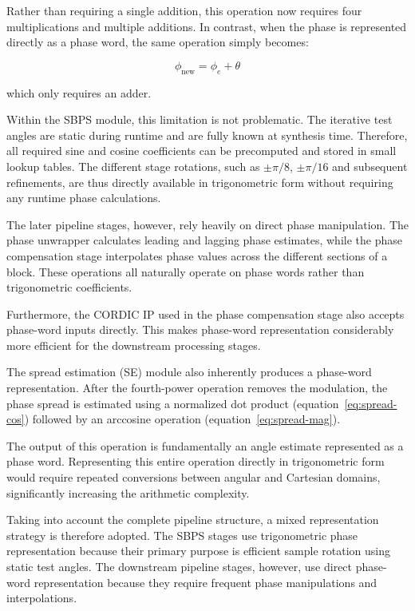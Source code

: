 Rather than requiring a single addition, this operation now requires four multiplications and multiple additions. 
In contrast, when the phase is represented directly as a phase word, the same operation simply becomes:

\begin{equation}
    \phi_{\text{new}} = \phi_e + \theta
\end{equation}

which only requires an adder.

Within the \ac{SBPS} module, this limitation is not problematic. The iterative test angles are static during runtime and are fully 
known at synthesis time. Therefore, all required sine and cosine coefficients can be precomputed and stored in small lookup tables. 
The different stage rotations, such as $\pm \pi/8$, $\pm \pi/16$ and subsequent refinements, are thus directly available in 
trigonometric form without requiring any runtime phase calculations.

The later pipeline stages, however, rely heavily on direct phase manipulation. The phase unwrapper calculates leading and lagging 
phase estimates, while the phase compensation stage interpolates phase values across the different sections of a block. These operations 
all naturally operate on phase words rather than trigonometric coefficients.

Furthermore, the \ac{CORDIC} IP used in the phase compensation stage also accepts phase-word inputs directly. This makes phase-word 
representation considerably more efficient for the downstream processing stages.

The spread estimation (\ac{SE}) module also inherently produces a phase-word representation. After the fourth-power operation removes 
the modulation, the phase spread is estimated using a normalized dot product (equation~\ref{eq:spread-cos}) 
followed by an arccosine operation (equation~\ref{eq:spread-mag}).

The output of this operation is fundamentally an angle estimate represented as a phase word. Representing this entire operation directly 
in trigonometric form would require repeated conversions between angular and Cartesian domains, significantly increasing the arithmetic complexity.

Taking into account the complete pipeline structure, a mixed representation strategy is therefore adopted. The \ac{SBPS} stages use 
trigonometric phase representation because their primary purpose is efficient sample rotation using static test angles. The downstream 
pipeline stages, however, use direct phase-word representation because they require frequent phase manipulations and interpolations.

